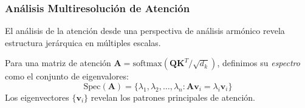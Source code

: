 \subsubsection{Análisis Multiresolución de Atención}

El análisis de la atención desde una perspectiva de análisis armónico revela estructura jerárquica en múltiples escalas.

\begin{definition}\label{def:attention_spectrum}
    Para una matriz de atención $\mathbf{A} = \text{softmax}(\mathbf{Q}\mathbf{K}^T/\sqrt{d_k})$, definimos su \textit{espectro} como el conjunto de eigenvalores:
    \begin{equation}
        \text{Spec}(\mathbf{A}) = \{\lambda_1, \lambda_2, \ldots, \lambda_n : \mathbf{A}\mathbf{v}_i = \lambda_i \mathbf{v}_i\}
        \label{eq:attention_spectrum}
    \end{equation}
    Los eigenvectores $\{\mathbf{v}_i\}$ revelan los patrones principales de atención.
\end{definition}

